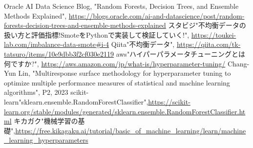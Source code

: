 \documentclass[platex]{suribt}
\begin{document}
\begin{thebibliography}{2}
\bibitem{}
Oracle AI Data Science Blog, "Random Forests, Decision Trees, and Ensemble Methods Explained",  \url{https://blogs.oracle.com/ai-and-datascience/post/random-forests-decision-trees-and-ensemble-methods-explained}
\bibitem{}
スタビジ"不均衡データの扱い方と評価指標!SmoteをPythonで実装して検証していく!", \url{https://toukei-lab.com/imbalance-data-smote#i-4}
\bibitem{}
Qiita"不均衡データ", \url{https://qiita.com/tk-tatsuro/items/10e9dbb3f2cf030e2119}
\bibitem{}
aws"ハイパーパラメータチューニングとは何ですか?", \url{https://aws.amazon.com/jp/what-is/hyperparameter-tuning/}
\bibitem{}
Chang-Yun Lin, "Multiresponse surface methodology for hyperparameter tuning to optimize multiple performance measures of statistical and machine learning algorithms", P2, 2023
\bibitem{}
scikit-learn"sklearn.ensemble.RandomForestClassifier",\url{https://scikit-learn.org/stable/modules/generated/sklearn.ensemble.RandomForestClassifier.html}
\bibitem{}
キカガク"機械学習の基礎",\url{https://free.kikagaku.ai/tutorial/basic_of_machine_learning/learn/machine_learning_hyperparameters}


\end{thebibliography}
\appendix%
\chapter{}
\end{document}

